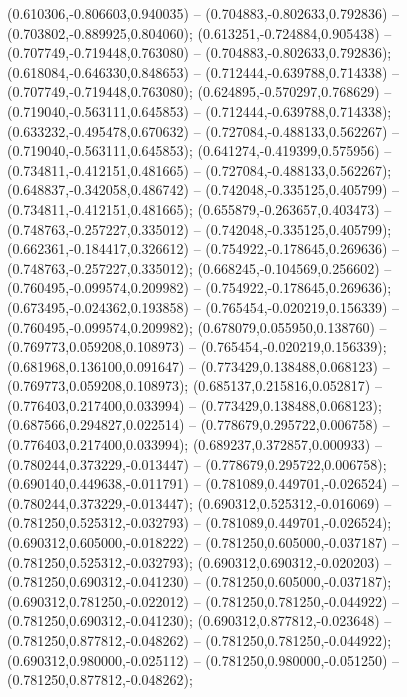  (0.610306,-0.806603,0.940035) -- (0.704883,-0.802633,0.792836) -- (0.703802,-0.889925,0.804060);
 (0.613251,-0.724884,0.905438) -- (0.707749,-0.719448,0.763080) -- (0.704883,-0.802633,0.792836);
 (0.618084,-0.646330,0.848653) -- (0.712444,-0.639788,0.714338) -- (0.707749,-0.719448,0.763080);
 (0.624895,-0.570297,0.768629) -- (0.719040,-0.563111,0.645853) -- (0.712444,-0.639788,0.714338);
 (0.633232,-0.495478,0.670632) -- (0.727084,-0.488133,0.562267) -- (0.719040,-0.563111,0.645853);
 (0.641274,-0.419399,0.575956) -- (0.734811,-0.412151,0.481665) -- (0.727084,-0.488133,0.562267);
 (0.648837,-0.342058,0.486742) -- (0.742048,-0.335125,0.405799) -- (0.734811,-0.412151,0.481665);
 (0.655879,-0.263657,0.403473) -- (0.748763,-0.257227,0.335012) -- (0.742048,-0.335125,0.405799);
 (0.662361,-0.184417,0.326612) -- (0.754922,-0.178645,0.269636) -- (0.748763,-0.257227,0.335012);
 (0.668245,-0.104569,0.256602) -- (0.760495,-0.099574,0.209982) -- (0.754922,-0.178645,0.269636);
 (0.673495,-0.024362,0.193858) -- (0.765454,-0.020219,0.156339) -- (0.760495,-0.099574,0.209982);
 (0.678079,0.055950,0.138760) -- (0.769773,0.059208,0.108973) -- (0.765454,-0.020219,0.156339);
 (0.681968,0.136100,0.091647) -- (0.773429,0.138488,0.068123) -- (0.769773,0.059208,0.108973);
 (0.685137,0.215816,0.052817) -- (0.776403,0.217400,0.033994) -- (0.773429,0.138488,0.068123);
 (0.687566,0.294827,0.022514) -- (0.778679,0.295722,0.006758) -- (0.776403,0.217400,0.033994);
 (0.689237,0.372857,0.000933) -- (0.780244,0.373229,-0.013447) -- (0.778679,0.295722,0.006758);
 (0.690140,0.449638,-0.011791) -- (0.781089,0.449701,-0.026524) -- (0.780244,0.373229,-0.013447);
 (0.690312,0.525312,-0.016069) -- (0.781250,0.525312,-0.032793) -- (0.781089,0.449701,-0.026524);
 (0.690312,0.605000,-0.018222) -- (0.781250,0.605000,-0.037187) -- (0.781250,0.525312,-0.032793);
 (0.690312,0.690312,-0.020203) -- (0.781250,0.690312,-0.041230) -- (0.781250,0.605000,-0.037187);
 (0.690312,0.781250,-0.022012) -- (0.781250,0.781250,-0.044922) -- (0.781250,0.690312,-0.041230);
 (0.690312,0.877812,-0.023648) -- (0.781250,0.877812,-0.048262) -- (0.781250,0.781250,-0.044922);
 (0.690312,0.980000,-0.025112) -- (0.781250,0.980000,-0.051250) -- (0.781250,0.877812,-0.048262);
